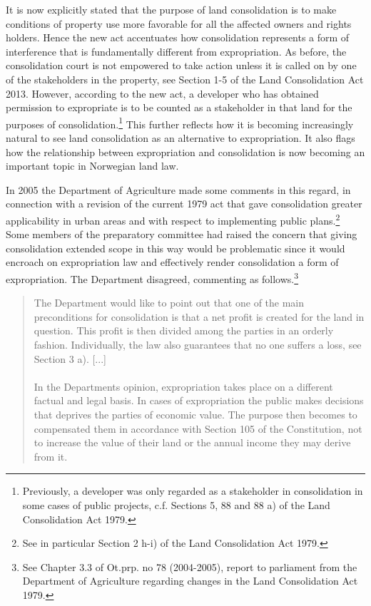 It is now explicitly stated that the purpose of land consolidation is to make conditions of property use more favorable for all the affected owners and rights holders. Hence the new act accentuates how consolidation represents a form of interference that is fundamentally different from expropriation. As before, the consolidation court is not empowered to take action unless it is called on by one of the stakeholders in the property, see Section 1-5 of the Land Consolidation Act 2013. However, according to the new act, a developer who has obtained permission to expropriate is to be counted as a stakeholder in that land for the purposes of consolidation.\footnote{Previously, a developer was only regarded as a stakeholder in consolidation in some cases of public projects, c.f. Sections 5, 88 and 88 a) of the Land Consolidation Act 1979.} This further reflects how it is becoming increasingly natural to see land consolidation as an alternative to expropriation. It also flags how the relationship between expropriation and consolidation is now becoming an important topic in Norwegian land law.

In 2005 the Department of Agriculture made some comments in this regard, in connection with a revision of the current 1979 act that gave consolidation greater applicability in urban areas and with respect to implementing public plans.\footnote{See in particular Section 2 h-i) of the Land Consolidation Act 1979.} Some members of the preparatory committee had raised the concern that giving consolidation extended scope in this way would be problematic since it would encroach on expropriation law and effectively render consolidation a form of expropriation. The Department disagreed, commenting as follows.\footnote{See Chapter 3.3 of Ot.prp. no 78 (2004-2005), report to parliament from the Department of Agriculture regarding changes in the Land Consolidation Act 1979.}

\begin{quote}
The Department would like to point out that one of the main preconditions for consolidation is that a net profit is created for the land in question. This profit is then divided among the parties in an orderly fashion. Individually, the law also guarantees that no one suffers a loss, see Section 3 a). [...] \\ \\ In the Departments opinion, expropriation takes place on a different factual and legal basis. In cases of expropriation the public makes decisions that deprives the parties of economic value. The purpose then becomes to compensated them in accordance with Section 105 of the Constitution, not to increase the value of their land or the annual income they may derive from it.
\end{quote}

